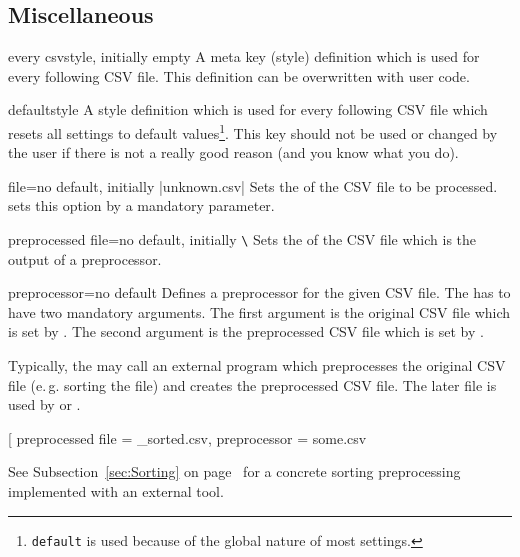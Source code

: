 \documentclass[a4paper,11pt]{ltxdoc}
\begin{document}
\clearpage
\subsection{Miscellaneous}%

\begin{docCsvKey}{every csv}{}{style, initially empty}
  A meta key (style) definition which is used for every following CSV file.
  This definition can be overwritten with user code.
\begin{dispListing}
\end{dispListing}
\end{docCsvKey}

\begin{docCsvKey}{default}{}{style}
  A style definition which is used for every following CSV file which
  resets all settings to default values\footnote{\texttt{default} is used
  because of the global nature of most settings.}.
  This key should not be used or changed by the user if there is not a
  really good reason (and you know what you do).
\end{docCsvKey}


\begin{docCsvKey}{file}{=}{no default, initially |unknown.csv|}
  Sets the  of the CSV file to be processed.
   sets this option by a mandatory parameter.
\end{docCsvKey}


\begin{docCsvKey}{preprocessed file}{=}{no default, initially \texttt{\textbackslash{}}}
  Sets the  of the CSV file which is the output of a
  preprocessor.
\end{docCsvKey}


\begin{docCsvKey}{preprocessor}{=}{no default}
  Defines a preprocessor for the given CSV file.
  The  has to have two mandatory arguments. The first argument
  is the original CSV file which is set by .
  The second argument is the preprocessed CSV file
  which is set by .\par\smallskip
  Typically, the  may call an external program which preprocesses
  the original CSV file (e.\,g. sorting the file) and creates the
  preprocessed CSV file. The later file is used by 
  or .
\begin{dispListing}
\newcommand{\mySortTool}[2]{%
}

\csvreader[%
    preprocessed file = \jobname_sorted.csv,
    preprocessor      = \mySortTool,
  ]{some.csv}{}{%
}
\end{dispListing}
See Subsection~\ref{sec:Sorting} on page~\pageref{sec:Sorting} for a
concrete sorting preprocessing implemented with an external tool.
\end{docCsvKey}
\end{document}
